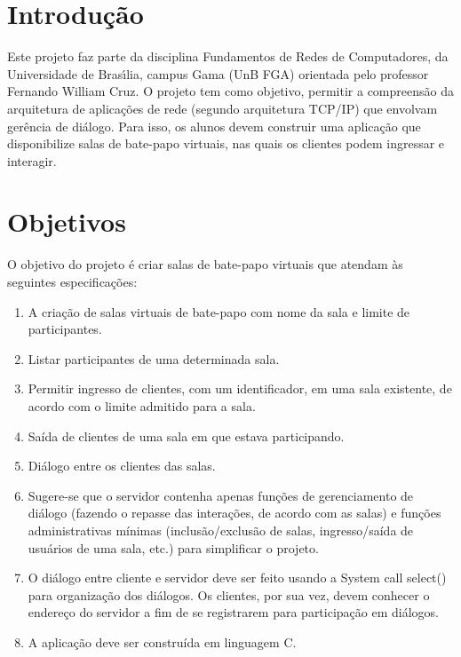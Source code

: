 \documentclass[a4paper]{article}
\begin{document}
\newpage

{}
\large

\section{Introdução}

Este projeto faz parte da disciplina Fundamentos de Redes de Computadores, da Universidade de Brası́lia, campus Gama (UnB FGA) orientada pelo professor Fernando William Cruz. O projeto tem como objetivo, permitir a compreensão da arquitetura de aplicações de rede (segundo arquitetura TCP/IP) que envolvam gerência de diálogo. Para isso, os alunos devem construir uma aplicação que disponibilize salas de bate-papo virtuais, nas quais os clientes podem ingressar e interagir.

\section{Objetivos}

O objetivo do projeto é criar salas de bate-papo virtuais que atendam
às seguintes especificações:

 \begin{enumerate}
   \item A criação de salas virtuais de bate-papo com nome da sala e limite de participantes.
   \item Listar participantes de uma determinada sala.
    \item Permitir ingresso de clientes, com um identificador, em uma sala existente, de acordo com o limite admitido para a sala.
    \item Saída de clientes de uma sala em que estava participando.
    \item Diálogo entre os clientes das salas.
    \item Sugere-se que o servidor contenha apenas funções de gerenciamento de diálogo (fazendo o repasse das
    interações, de acordo com as salas) e funções administrativas mínimas (inclusão/exclusão de salas, ingresso/saída de usuários de uma sala, etc.) para simplificar o projeto.
    \item O diálogo entre cliente e servidor deve ser feito usando a System call select() para organização dos diálogos. Os clientes, por sua vez, devem conhecer o endereço do servidor a fim de se registrarem para participação em diálogos.
\item A aplicação deve ser construída em linguagem C.

\end{enumerate}
\end{document}
